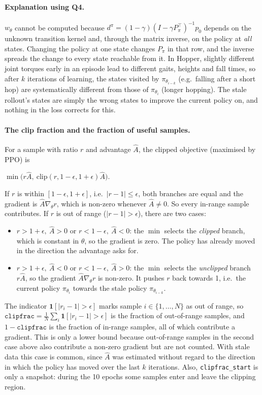 \documentclass[11pt]{article}
\newcommand{\Ahat}{\hat{A}}
\newcommand{\code}[1]{\texttt{#1}}
\begin{document}
\paragraph{Explanation using Q4.}
$w_\theta$ cannot be computed because $d^{\pi}=(1-\gamma)(I-\gamma P_\pi^\top)^{-1}p_0$ depends
on the unknown transition kernel and, through the matrix inverse, on the policy at \emph{all} states.
Changing the policy at one state changes $P_\pi$ in that row, and the inverse spreads the change to every
state reachable from it. In Hopper, slightly different joint torques early in an episode
lead to different gaits, heights and fall times, so after $k$ iterations of learning, the states
visited by $\pi_{\theta_{i-k}}$ (e.g.\ falling after a short hop) are systematically different from those
of $\pi_{\theta_i}$ (longer hopping). The stale rollout's states are simply the wrong states to improve
the current policy on, and nothing in the loss corrects for this.

\paragraph{The clip fraction and the fraction of useful samples.}
For a sample with ratio $r$ and advantage $\Ahat$, the clipped objective (maximised by PPO) is
\begin{center}
  $\min\big(r\Ahat,\ \mathrm{clip}(r, 1-\epsilon, 1+\epsilon)\Ahat\big)$.
\end{center}
If $r$ is within $[1-\epsilon, 1+\epsilon]$, i.e.\ $|r-1|\le\epsilon$, both branches are equal and
the gradient is $\Ahat\nabla_\theta r$, which is non-zero whenever $\Ahat\neq0$. So every in-range
sample contributes. If $r$ is out of range ($|r-1|>\epsilon$), there are two cases:
\begin{itemize}[nosep]
  \item $r>1+\epsilon,\ \Ahat>0$ or $r<1-\epsilon,\ \Ahat<0$: the $\min$ selects the
        \emph{clipped} branch, which is constant in $\theta$, so the gradient is zero. The policy has
        already moved in the direction the advantage asks for.
  \item $r>1+\epsilon,\ \Ahat<0$ or $r<1-\epsilon,\ \Ahat>0$: the $\min$ selects the
        \emph{unclipped} branch $r\Ahat$, so the gradient $\Ahat\nabla_\theta r$ is non-zero. It pushes
        $r$ back towards 1, i.e.\ the current policy $\pi_{\theta_i}$ towards the stale policy
        $\pi_{\theta_{i-k}}$.
\end{itemize}
The indicator $\mathbf{1}[|r_i - 1| > \epsilon]$ marks sample $i\in\{1,\dots,N\}$ as out of range, so
$\code{clipfrac} = \frac{1}{N}\sum_i \mathbf{1}[|r_i - 1| > \epsilon]$ is the fraction of
out-of-range samples, and $1-\code{clipfrac}$ is the fraction of in-range samples, all of which
contribute a gradient. This is only a lower bound because out-of-range samples in the second case
above also contribute a non-zero gradient but are not counted. With stale data this case is
common, since $\Ahat$ was estimated without regard to the direction in which the policy has moved
over the last $k$ iterations. Also, \code{clipfrac\_start} is only a snapshot: during the 10 epochs
some samples enter and leave the clipping region.
\end{document}
